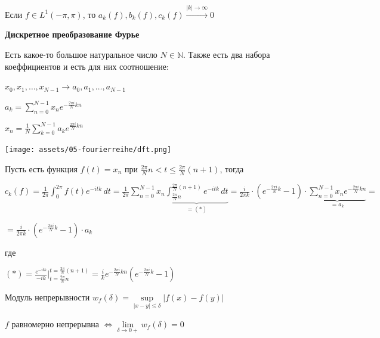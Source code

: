 \begin{consequence}
    Если $f \in L^1 (-\pi, \pi)$, то $a_k (f), b_k (f), c_k (f) \overset{|k| \to \infty}{\rightarrow} 0$
\end{consequence}

\begin{theorem}
    \textbf{Дискретное преобразование Фурье}

    Есть какое-то большое натуральное число $N \in \mathbb{N}$. Также есть два набора коеффициентов и есть для них соотношение:

    $x_0, x_1, \ldots, x_{N - 1} \rightarrow a_0, a_1, \ldots, a_{N - 1}$

    $a_k = \sum\limits_{n = 0}^{N - 1} x_n e^{-\frac{2\pi i}{N} kn}$

    $x_n = \frac{1}{N} \sum\limits_{k = 0}^{N - 1} a_k e^{\frac{2\pi i}{N} kn}$

    \begin{center}
        \texttt{[image: assets/05-fourierreihe/dft.png]}
    \end{center}

    Пусть есть функция $f(t) = x_n$ при $\frac{2\pi}{N}n < t \leqslant \frac{2\pi}{N} (n + 1)$, тогда

    $c_k (f) = \frac{1}{2\pi} \int_0^{2\pi} f(t) e^{-itk}\, dt =
    \frac{1}{2\pi} \sum\limits_{n = 0}^{N - 1} x_n \underbrace{\int_{\frac{2\pi}{N} n}^{\frac{2\pi}{N} (n + 1)} e^{-itk} \, dt}_{=(*)} =
    \frac{i}{2 \pi k} \cdot \left( e^{- \frac{2 \pi i}{N} k} - 1 \right) \cdot \underbrace{\sum\limits_{n=0}^{N - 1} x_n e^{- \frac{2 \pi i}{N} kn}}_{=a_k} =$

    $= \frac{i}{2 \pi k} \cdot \left( e^{- \frac{2 \pi i}{N} k} - 1 \right) \cdot a_k$


    где

    $(*) = \frac{e^{-itk}}{-ik} \bigg |_{t=\frac{2\pi}{N} n}^{t=\frac{2\pi}{N} (n + 1)} = \frac{i}{k} e^{- \frac{2\pi i}{N} kn} (e^{- \frac{2 \pi i}{N} k} - 1)$
\end{theorem}


\begin{definition}
    Модуль непрерывности $w_f (\delta) = \sup\limits_{|x - y| \leqslant \delta} |f(x) - f(y)|$

    \begin{remark}
        $f$ равномерно непрерывна $\Longleftrightarrow \lim\limits_{\delta \to 0+} w_f (\delta) = 0$
    \end{remark}
\end{definition}

